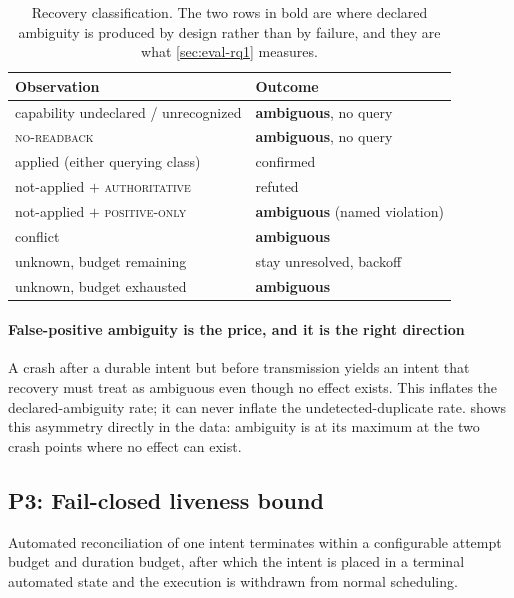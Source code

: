 \begin{table}[t]
\centering
\caption{Recovery classification. The two rows in bold are where declared
ambiguity is produced by design rather than by failure, and they are what
\cref{sec:eval-rq1} measures.}
\label{tab:classification}
\small
\begin{tabular}{@{}p{}p{}@{}}
\toprule
Observation & Outcome \\
\midrule
capability undeclared / unrecognized & \textbf{ambiguous}, no query \\
\textsc{no-readback}                 & \textbf{ambiguous}, no query \\
applied (either querying class)      & confirmed \\
not-applied $+$ \textsc{authoritative} & refuted \\
not-applied $+$ \textsc{positive-only} & \textbf{ambiguous} (named violation) \\
conflict                             & \textbf{ambiguous} \\
unknown, budget remaining            & stay unresolved, backoff \\
unknown, budget exhausted            & \textbf{ambiguous} \\
\bottomrule
\end{tabular}
\end{table}

\paragraph{False-positive ambiguity is the price, and it is the right
direction} A crash after a durable intent but before transmission yields
an intent that recovery must treat as ambiguous even though no effect
exists. This inflates the declared-ambiguity rate; it can never inflate the
undetected-duplicate rate.  shows this asymmetry directly in
the data: ambiguity is at its maximum at the two crash points where no effect
can exist.

\subsection{P3: Fail-closed liveness bound}
\label{sec:p3}

\begin{property}
Automated reconciliation of one intent terminates within a configurable attempt
budget and duration budget, after which the intent is placed in a terminal
automated state and the execution is withdrawn from normal scheduling.
\end{property}

